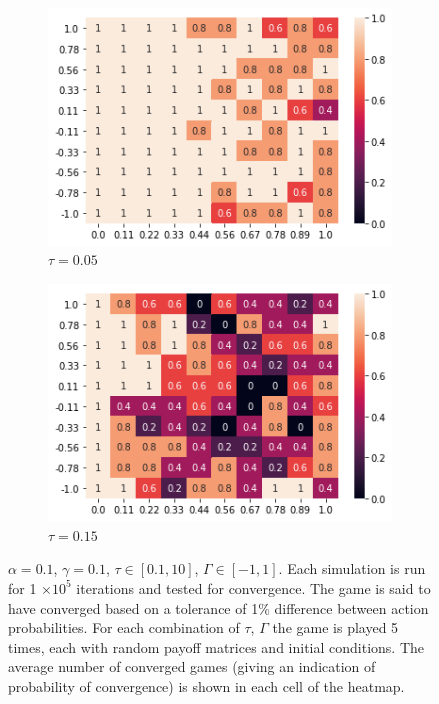 \documentclass[.../main.tex]{subfiles}
\begin{document}
    \begin{figure}[h]
        \centering
         \begin{subfigure}[b]{0.45 \textwidth}
        \centering
        \includegraphics[width = 0.7 \textwidth]{Figures/AlphaRun_tau_005.png}
        \caption{$\tau = 0.05$}
        \end{subfigure}
        \begin{subfigure}[b]{0.45 \textwidth}
        \centering
        \includegraphics[width = 0.7 \textwidth]{Figures/tau_015.png}
        \caption{$\tau = 0.15$}
        \end{subfigure}

        \caption{$\alpha = 0.1$, $\gamma = 0.1$, $\tau \in [0.1, 10]$, $\Gamma \in [-1, 1]$. Each
        simulation is run for 1 $\times 10^5$ iterations and tested for convergence. The game is
        said to have
        converged based on a tolerance of 1\% difference between action probabilities. For each
        combination of $\tau$, $\Gamma$ the game is played 5 times, each with random payoff matrices
        and initial conditions. The average number of converged games (giving an indication of
        probability of convergence) is shown in each cell of the heatmap. 
        \label{fig::NumericalExperiments}}
    \end{figure}
\end{document}
